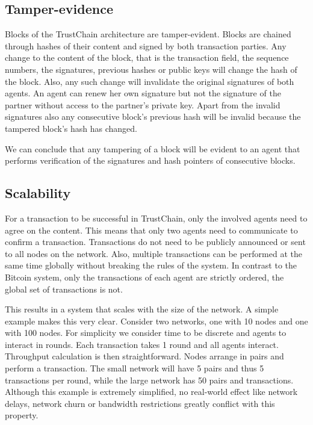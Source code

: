 \subsection{Tamper-evidence}
\label{sec:tamper-proof}
Blocks of the TrustChain architecture are tamper-evident. Blocks are chained through hashes of their
content and signed by both transaction parties. Any change to the content of the block, that is the
transaction field, the sequence numbers, the signatures, previous hashes or public keys will change
the hash of the block. Also, any such change will invalidate the original signatures of both agents. An agent
can renew her own signature but not the signature of the partner without access to the 
partner's private key. Apart from the invalid signatures also any consecutive block's previous hash
will be invalid because the tampered block's hash has changed.

We can conclude that any tampering of a block will be evident to an agent that performs verification
of the signatures and hash pointers of consecutive blocks.

\subsection{Scalability}
\label{sec:trustchain_scalability}
For a transaction to be successful in TrustChain, only the involved agents need to agree on the content. This
means that only two agents need to communicate to confirm a transaction. Transactions do not need to 
be publicly announced or sent to all nodes on
the network. Also, multiple transactions can be performed at the same time globally without breaking
the rules of the system. In contrast to the Bitcoin system, only the transactions of each agent are
strictly ordered, the global set of transactions is not.

This results in a system that scales with the size of the network. A simple example makes this very 
clear. Consider two networks, one with 10 nodes and one with 100 nodes. For simplicity we consider
time to be discrete and agents to interact in rounds. Each transaction takes 1 round and all agents 
interact. Throughput calculation is then straightforward. Nodes arrange in pairs and perform a
transaction. The small network will have 5 pairs and thus 5 transactions per round, while the large
network has 50 pairs and transactions. Although this example is extremely simplified, no real-world
effect like network delays, network churn or bandwidth restrictions greatly conflict with this property.

